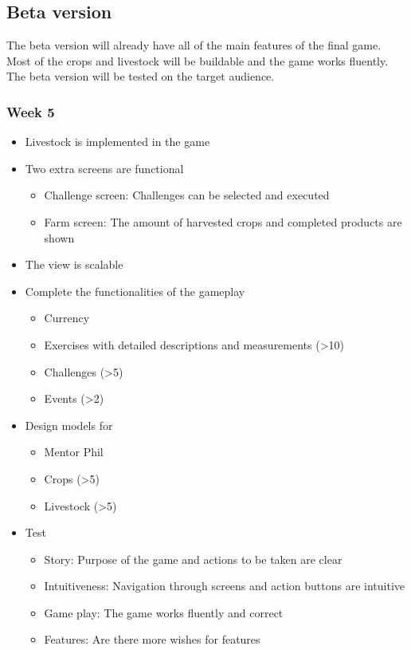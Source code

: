 \documentclass[a4paper,11pt,notitlepage]{report}
\begin{document}
\subsection{Beta version}
The beta version will already have all of the main features of the final game. Most of the crops and livestock will be buildable and the game works fluently. The beta version will be tested on the target audience.
\subsubsection{Week 5}
\begin{itemize}
\item Livestock is implemented in the game
\item Two extra screens are functional
\begin{itemize}
\item Challenge screen: Challenges can be selected and executed
\item Farm screen: The amount of harvested crops and completed products are shown
\end{itemize}
\item The view is scalable
\item Complete the functionalities of the gameplay
\begin{itemize} 
\item Currency
\item Exercises with detailed descriptions and measurements (>10) 
\item Challenges (>5)
\item Events (>2)
\end{itemize}
\item Design models for
\begin{itemize}
\item Mentor Phil
\item Crops (>5)
\item Livestock (>5)
\end{itemize}
\item Test 
\begin{itemize}
\item Story: Purpose of the game and actions to be taken are clear 
\item Intuitiveness: Navigation through screens and action buttons are intuitive
\item Game play: The game works fluently and correct
\item Features: Are there more wishes for features
\end{itemize}
\end{itemize}
\end{document}
